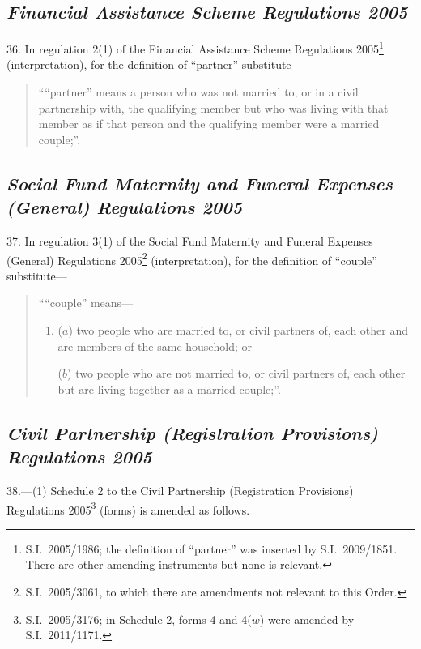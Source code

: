 \documentclass[12pt,a4paper]{article}
\begin{document}
\subsection*{\itshape Financial Assistance Scheme Regulations 2005}

36.  In regulation 2(1) of the Financial Assistance Scheme Regulations 2005\footnote{S.I.~2005/1986; the definition of “partner” was inserted by S.I.~2009/1851. There are other amending instruments but none is relevant.} (interpretation), for the definition of “partner” substitute—
\begin{quotation}
““partner” means a person who was not married to, or in a civil partnership with, the qualifying member but who was living with that member as if that person and the qualifying member were a married couple;”.
\end{quotation}

\subsection*{\itshape Social Fund Maternity and Funeral Expenses (General) Regulations 2005}

37.  In regulation 3(1) of the Social Fund Maternity and Funeral Expenses (General) Regulations 2005\footnote{S.I.~2005/3061, to which there are amendments not relevant to this Order.} (interpretation), for the definition of “couple” substitute—
\begin{quotation}
““couple” means—
\begin{enumerate}\item[]
($a$) 
two people who are married to, or civil partners of, each other and are members of the same household; or

($b$) 
two people who are not married to, or civil partners of, each other but are living together as a married couple;”.
\end{enumerate}
\end{quotation}

\subsection*{\itshape\sloppy Civil Partnership (Registration Provisions) Regulations 2005}

38.—(1) Schedule 2 to the Civil Partnership (Registration Provisions) Regulations 2005\footnote{S.I.~2005/3176; in Schedule 2, forms 4 and 4($w$)  were amended by S.I.~2011/1171.} (forms) is amended as follows.
\end{document}
